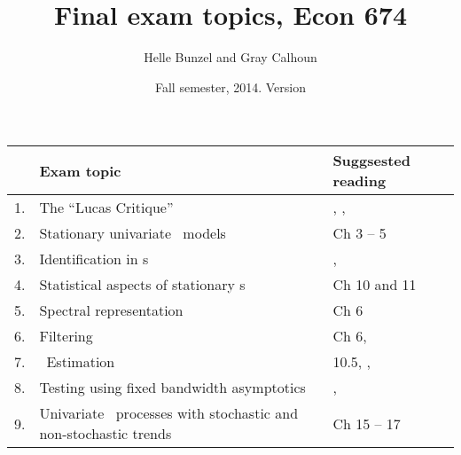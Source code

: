 \documentclass[nofonts,nols]{tufte-handout}
\title{Final exam topics, Econ 674}
\author{Helle Bunzel and Gray Calhoun}
\date{Fall semester, 2014. Version \version}
\renewcommand{\allcaps}[1]{\textls{\MakeUppercase{#1}}}
\newcommand{\ARMA}{\allcaps{ARMA}}
\newcommand{\HAC}{\allcaps{HAC}}
\newcommand{\SVAR}{\allcaps{SVAR}}
\newcommand{\VAR}{\allcaps{VAR}}
\begin{document}
\maketitle

\begin{table*}[h]
  \begin{tabularx}{\textwidth}{rXX}
    \toprule
        & Exam topic                                                             & Suggsested reading                                                                                      \\
    \midrule
    1.  & The ``Lucas Critique''                                                 & \citep{Lu76}, \citep{No11}, \citep{Si12}                                                                \\
    2.  & Stationary univariate \ARMA\ models                                    & \citep{Ha94} Ch 3 -- 5                                                                                  \\
    3.  & Identification in \SVAR s                                              & \citep{Si80}, \citep{Ki13}                                                                              \\
    4.  & Statistical aspects of stationary \VAR s                               & \citep{Ha94} Ch 10 and 11                                                                               \\
    5.  & Spectral representation                                                & \citep{Ha94} Ch 6                                                                                       \\
    6.  & Filtering                                                              & \citep{Ha94} Ch 6, \citep{BK99}                                                                         \\
    7.  & \HAC\ Estimation                                                       & \citep{Ha94} 10.5, \citep{NW87}, \citep{An91}                                                           \\
    8.  & Testing using fixed bandwidth asymptotics                              & \citep{KV05}, \citep{Su14}                                                                              \\
    9.  & Univariate \ARMA\ processes with stochastic and non-stochastic trends  & \citep{Ha94} Ch 15 -- 17                                                                                \\

\end{tabularx}
\end{table*}
\end{document}
